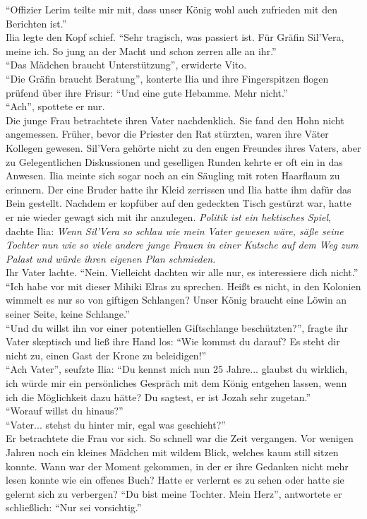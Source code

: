 ``Offizier Lerim teilte mir mit, dass unser König wohl auch zufrieden mit den Berichten ist.''\\
Ilia legte den Kopf schief. ``Sehr tragisch, was passiert ist. Für Gräfin Sil'Vera, meine ich. 
So jung an der Macht und schon zerren alle an ihr.''\\
``Das Mädchen braucht Unterstützung'', erwiderte Vito.\\
``Die Gräfin braucht Beratung'', konterte Ilia und ihre Fingerspitzen flogen prüfend über ihre 
Frisur: ``Und eine gute Hebamme. Mehr nicht.''\\
``Ach'', spottete er nur.\\
Die junge Frau betrachtete ihren Vater nachdenklich. Sie fand den Hohn nicht angemessen. Früher, 
bevor die Priester den Rat stürzten, waren ihre Väter Kollegen gewesen. Sil'Vera gehörte nicht zu 
den engen Freundes ihres Vaters, aber zu Gelegentlichen Diskussionen und geselligen Runden kehrte 
er oft ein in das Anwesen. Ilia meinte sich sogar noch an ein Säugling mit roten Haarflaum zu 
erinnern. Der eine Bruder hatte ihr Kleid zerrissen und Ilia hatte ihm dafür das Bein gestellt. 
Nachdem er kopfüber auf den gedeckten Tisch gestürzt war, hatte er nie wieder gewagt sich mit ihr 
anzulegen. \textit{Politik ist ein hektisches Spiel}, dachte Ilia: \textit{Wenn Sil'Vera so schlau 
wie mein Vater gewesen wäre, säße seine Tochter nun wie so viele andere junge Frauen in einer 
Kutsche auf dem Weg zum Palast und würde ihren eigenen Plan schmieden.}\\
Ihr Vater lachte. ``Nein. Vielleicht dachten wir alle nur, es interessiere dich nicht.''\\
``Ich habe vor mit dieser Mihiki Elras zu sprechen. Heißt es nicht, in den Kolonien wimmelt es 
nur so von giftigen Schlangen? Unser König braucht eine Löwin an seiner Seite, keine Schlange.''\\
``Und du willst ihn vor einer potentiellen Giftschlange beschützten?'', fragte ihr Vater skeptisch 
und ließ ihre Hand los: ``Wie kommst du darauf? Es steht dir nicht zu, einen Gast der Krone zu 
beleidigen!''\\
``Ach Vater'', seufzte Ilia: ``Du kennst mich nun 25 Jahre... glaubst du wirklich, ich würde mir 
ein persönliches Gespräch mit dem König entgehen lassen, wenn ich die Möglichkeit dazu hätte? Du 
sagtest, er ist Jozah sehr zugetan.''\\
``Worauf willst du hinaus?''\\
``Vater... stehst du hinter mir, egal was geschieht?''\\
Er betrachtete die Frau vor sich. So schnell war die Zeit vergangen. Vor wenigen Jahren noch ein 
kleines Mädchen mit wildem Blick, welches kaum still sitzen konnte. Wann war der Moment gekommen, 
in der er ihre Gedanken nicht mehr lesen konnte wie ein offenes Buch? Hatte er verlernt es zu sehen 
oder hatte sie gelernt sich zu verbergen? ``Du bist meine Tochter. Mein Herz'', antwortete er 
schließlich: ``Nur sei vorsichtig.''\\

